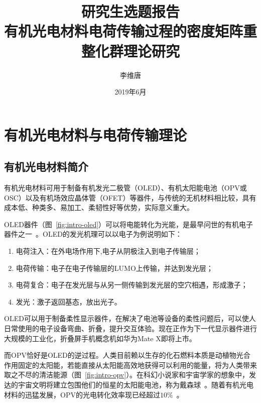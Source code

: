 \documentclass{article}
\title{研究生选题报告 \\ 有机光电材料电荷传输过程的密度矩阵重整化群理论研究}
\author{李维唐}
\date{2019年6月}
\begin{document}
\maketitle

\section{有机光电材料与电荷传输理论}

\subsection{有机光电材料简介}

有机光电材料可用于制备有机发光二极管（OLED）、有机太阳能电池（OPV或OSC）以及有机场效应晶体管（OFET）等器件，与传统的无机材料相比较，具有成本低、种类多、易加工、柔韧性好等优势，实际意义重大。

OLED器件（图~\ref{fig:intro-oled}）可以将电能转化为光能，是最早问世的有机电子器件之一~\cite{TANG55,LO07,CHEN10}。OLED的发光机理可以以电子为例说明如下：
\begin{enumerate}
\item 电荷注入：在外电场作用下,电子从阴极注入到电子传输层；
\item 电荷传输：电子在电子传输层的LUMO上传输，并达到发光层；
\item 电荷复合：电子在发光层与从另一侧传输到发光层的空穴相遇，形成激子；
\item 发光：激子返回基态，放出光子。
\end{enumerate}

OLED可以用于制备柔性显示器件，在解决了电池等设备的柔性问题后，可以使人日常使用的电子设备弯曲、折叠，提升交互体验。现在正作为下一代显示器件进行大规模的工业化，折叠屏手机概念机如华为Mate X即将上市。

而OPV恰好是OLED的逆过程。人类目前赖以生存的化石燃料本质是动植物光合作用固定的太阳能，若能直接从太阳能高效地获得可以利用的能量，将为人类带来取之不尽的清洁能源（图~\ref{fig:intro-opv}）。在科幻小说家和宇宙学家的想象中，发达的宇宙文明将建立包围他们的恒星的太阳能电池，称为戴森球~\cite{FREE60}。随着有机光电材料的迅猛发展，OPV的光电转化效率现已经超过$10\%$~\cite{YOU13,ZHAO16,CLARKE10,ALLEN11}。
\end{document}
